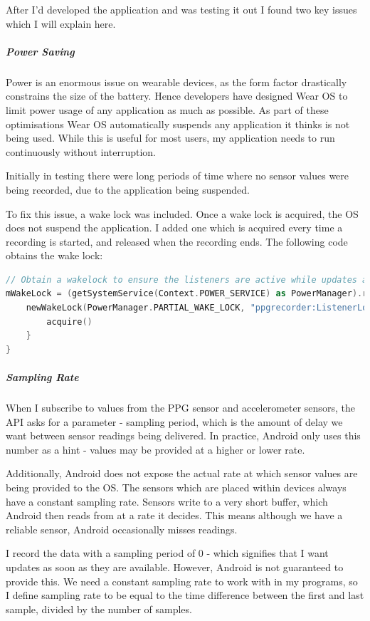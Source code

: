 \documentclass[12pt,a4paper,twoside,openright]{report}
\begin{document}
After I'd developed the application and was testing it out I found two key
issues which I will explain here.

\subparagraph{Power Saving}

Power is an enormous issue on wearable devices, as the form factor drastically
constrains the size of the battery. Hence developers have designed
Wear OS to limit power usage of any application as much as possible. 
As part of these optimisations Wear OS automatically suspends any application
it thinks is not being used. While this is useful for most users, my
application needs to run continuously without interruption.

Initially in testing there were long periods of time where no sensor values
were being recorded, due to the application being suspended.

To fix this issue, a wake lock was included. Once a wake lock is acquired, the
OS does not suspend the application. I added one which is acquired every time
a recording is started, and released when the recording ends. The following
code obtains the wake lock:

\begin{lstlisting}[language=Kotlin]
// Obtain a wakelock to ensure the listeners are active while updates are being provided
mWakeLock = (getSystemService(Context.POWER_SERVICE) as PowerManager).run {
	newWakeLock(PowerManager.PARTIAL_WAKE_LOCK, "ppgrecorder:ListenerLock").apply {
		acquire()
	}
}
\end{lstlisting}

\subparagraph{Sampling Rate}

When I subscribe to values from the PPG sensor and accelerometer sensors, the
API asks for a parameter - sampling period, which is the amount of delay we
want between sensor readings being delivered. In practice, Android only uses
this number as a hint - values may be provided at a higher or lower rate.

Additionally, Android does not expose the actual rate at which sensor values
are being provided to the OS. The sensors which are placed within devices
always have a constant sampling rate. Sensors write to a very short buffer,
which Android then reads from at a rate it decides. This means although we
have a reliable sensor, Android occasionally misses readings.

I record the data with a sampling period of 0 - which signifies that I want
updates as soon as they are available. However, Android is not guaranteed to
provide this. We need a constant sampling rate to work with in my programs, so I 
define sampling rate to be equal to the time difference
between the first and last sample, divided by the number of samples.
\end{document}
